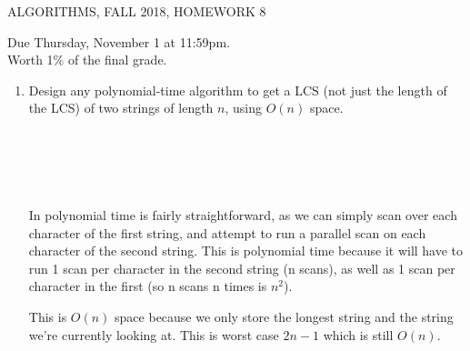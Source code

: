\documentclass[12pt]{article}
\begin{document}
  
\pagestyle{empty}
 

\begin{center} ALGORITHMS,   FALL 2018, HOMEWORK 8
\end{center}
\noindent Due Thursday, November 1 at 11:59pm.\\ 
\noindent Worth 1\% of the final grade.\\

\begin{enumerate}

 \item Design any polynomial-time algorithm to get a LCS (not just the length of the LCS) of two strings of length $n$, using $O(n)$ space.\\\\\\\\\\\\
 
  In polynomial time is fairly straightforward, as we can simply scan over each character of the first string, 
  and attempt to run a parallel scan on each character of the second string. This is polynomial time because it will have to run 1 scan per
  character in the second string (n scans), as well as 1 scan per character in the first (so n scans n times is $n^2$).

  This is $O(n)$ space because we only store the longest string and the string we're currently looking at. This is worst case $2n - 1$ which is still $O(n)$.


\end{enumerate}
\end{document}
